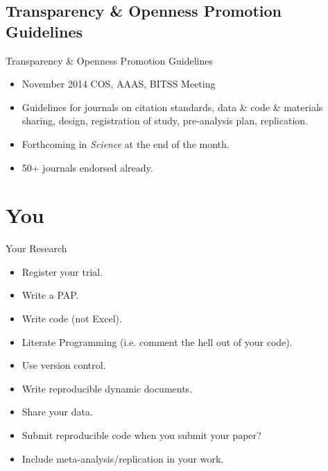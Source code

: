 \documentclass{beamer}
\begin{document}
\subsection{Transparency \& Openness Promotion Guidelines}
\begin{frame}{Transparency \& Openness Promotion Guidelines}
\begin{itemize}
\item November 2014 COS, AAAS, BITSS Meeting

\item Guidelines for journals on citation standards, data \& code \& materials sharing, design, registration of study, pre-analysis plan, replication.

\item Forthcoming in \textit{Science} at the end of the month. 

\item 50+ journals endorsed already.
\end{itemize} 
\end{frame}
\section{You}
\begin{frame}{Your Research}
\begin{itemize}
\item Register your trial.
\item Write a PAP.
\item Write code (not Excel).
\item Literate Programming (i.e. comment the hell out of your code).
\item Use version control.
\item Write reproducible dynamic documents.
\item Share your data.
\item Submit reproducible code when you submit your paper?
\item Include meta-analysis/replication in your work.
\end{itemize}
\end{frame}
\end{document}
